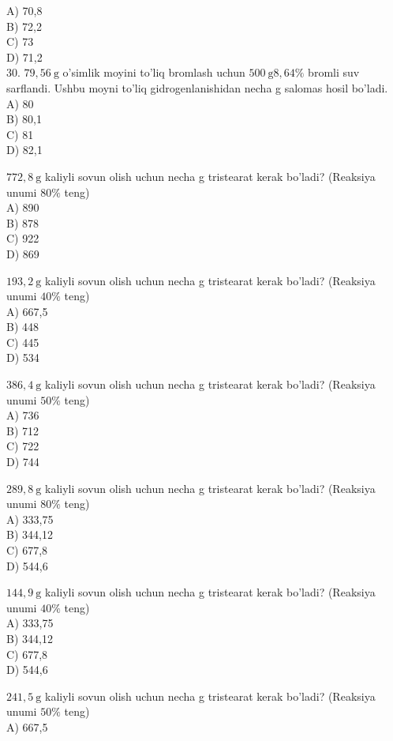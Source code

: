 A) 70,8\\
B) 72,2\\
C) 73\\
D) 71,2\\
30. $79,56 \mathrm{~g}$ o'simlik moyini to'liq bromlash uchun $500 \mathrm{~g} 8,64 \%$ bromli suv sarflandi. Ushbu moyni to'liq gidrogenlanishidan necha g salomas hosil bo'ladi.\\
A) 80\\
B) 80,1\\
C) 81\\
D) 82,1
  \item $772,8 \mathrm{~g}$ kaliyli sovun olish uchun necha g tristearat kerak bo'ladi? (Reaksiya unumi $80 \%$ teng)\\
A) 890\\
B) 878\\
C) 922\\
D) 869
  \item $193,2 \mathrm{~g}$ kaliyli sovun olish uchun necha g tristearat kerak bo'ladi? (Reaksiya unumi $40 \%$ teng)\\
A) 667,5\\
B) 448\\
C) 445\\
D) 534
  \item $386,4 \mathrm{~g}$ kaliyli sovun olish uchun necha g tristearat kerak bo'ladi? (Reaksiya unumi $50 \%$ teng)\\
A) 736\\
B) 712\\
C) 722\\
D) 744
  \item $289,8 \mathrm{~g}$ kaliyli sovun olish uchun necha g tristearat kerak bo'ladi? (Reaksiya unumi $80 \%$ teng)\\
A) 333,75\\
B) 344,12\\
C) 677,8\\
D) 544,6
  \item $144,9 \mathrm{~g}$ kaliyli sovun olish uchun necha g tristearat kerak bo'ladi? (Reaksiya unumi $40 \%$ teng)\\
A) 333,75\\
B) 344,12\\
C) 677,8\\
D) 544,6
  \item $241,5 \mathrm{~g}$ kaliyli sovun olish uchun necha g tristearat kerak bo'ladi? (Reaksiya unumi $50 \%$ teng)\\
A) 667,5\\
